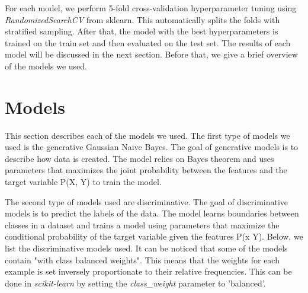 For each model, we perform 5-fold cross-validation hyperparameter tuning using \textit{RandomizedSearchCV} from sklearn. This automatically splits the folds with stratified sampling. After that, the model with the best hyperparameters is trained on the train set and then evaluated on the test set. The results of each model will be discussed in the next section. Before that, we give a brief overview of the models we used.

\section{Models}

This section describes each of the models we used. The first type of models we used is the generative Gaussian Naive Bayes. The goal of generative models is to describe how data is created. The model relies on Bayes theorem and uses parameters that maximizes the joint probability between the features and the target variable P(X, Y) to train the model.

The second type of models used are discriminative. The goal of discriminative models is to predict the labels of the data. The model learns boundaries between classes in a dataset and trains a model using parameters that maximize the conditional probability of the target variable given the features P(x \textbar Y). Below, we list the discriminative models used. It can be noticed that some of the models contain "with class balanced weights". This means that the weights for each example is set inversely proportionate to their relative frequencies. This can be done in \textit{scikit-learn} by setting the \textit{class\_weight} parameter to 'balanced'.

